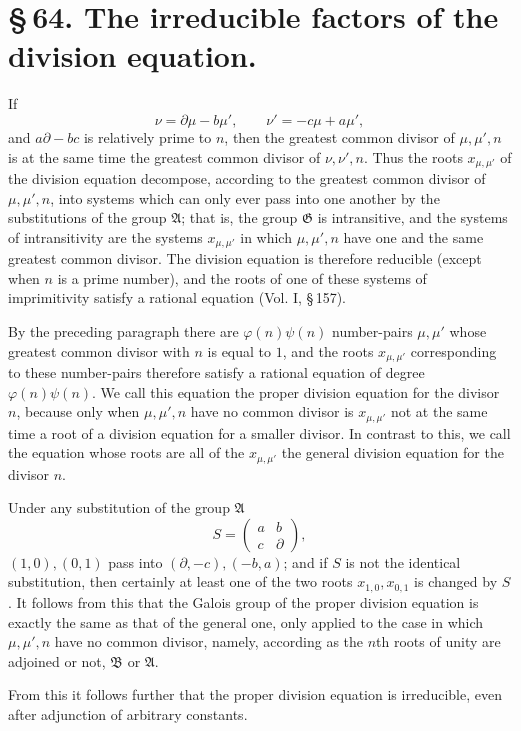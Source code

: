 \documentclass[11pt]{article}
\begin{document}
\section*{\S\,64. The irreducible factors of the division equation.}

If
\[
 \nu=\partial\mu-b\mu',
 \qquad
 \nu'=-c\mu+a\mu',
\]
and $a\partial-bc$ is relatively prime to $n$, then the greatest common divisor of
$\mu,\mu',n$ is at the same time the greatest common divisor of $\nu,\nu',n$. Thus the
roots $x_{\mu,\mu'}$ of the division equation decompose, according to the greatest common
divisor of $\mu,\mu',n$, into systems which can only ever pass into one another by the
substitutions of the group $\mathfrak A$; that is, the group $\mathfrak G$ is intransitive, and
the systems of intransitivity are the systems $x_{\mu,\mu'}$ in which $\mu,\mu',n$ have one
and the same greatest common divisor. The division equation is therefore reducible
(except when $n$ is a prime number), and the roots of one of these systems of imprimitivity
satisfy a rational equation (Vol. I, \S\,157).

By the preceding paragraph there are $\varphi(n)\psi(n)$ number-pairs $\mu,\mu'$ whose
greatest common divisor with $n$ is equal to $1$, and the roots $x_{\mu,\mu'}$ corresponding
to these number-pairs therefore satisfy a rational equation of degree $\varphi(n)\psi(n)$.
We call this equation the proper division equation for the divisor $n$, because only when
$\mu,\mu',n$ have no common divisor is $x_{\mu,\mu'}$ not at the same time a root of a
division equation for a smaller divisor. In contrast to this, we call the equation whose roots
are all of the $x_{\mu,\mu'}$ the general division equation for the divisor $n$.

Under any substitution of the group $\mathfrak A$
\[
 S=\begin{pmatrix}a&b\\ c&\partial\end{pmatrix},
\]
$(1,0),(0,1)$ pass into $(\partial,-c),(-b,a)$; and if $S$ is not the identical substitution,
then certainly at least one of the two roots $x_{1,0},x_{0,1}$ is changed by $S$. It follows
from this that the Galois group of the proper division equation is exactly the same as
that of the general one, only applied to the case in which $\mu,\mu',n$ have no common
divisor, namely, according as the $n$th roots of unity are adjoined or not, $\mathfrak B$ or
$\mathfrak A$.

From this it follows further that the proper division equation is irreducible, even after
adjunction of arbitrary constants.
\end{document}
